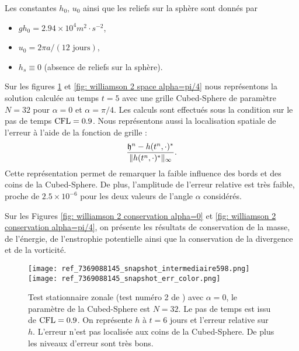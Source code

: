 Les constantes $h_0$, $u_0$ ainsi que les reliefs sur la sphère sont donnés par 
\begin{itemize}
\item $g h_0= 2.94 \times 10^4 m^2 \cdot \si{s^{-2}}$,
\item $u_0= 2 \pi a / (12 \text{ jours})$,
\item $h_s \equiv 0$ (absence de reliefs sur la sphère).
\end{itemize}

Sur les figures \ref{fig: williamson 2 space alpha=0} et \ref{fig: williamson 2 space alpha=pi/4} nous représentons la solution calculée au temps $t=5$ avec une grille Cubed-Sphere de paramètre $N=32$ pour $\alpha= 0$ et $\alpha= \pi/4$. Les calculs sont effectués sous la condition sur le pas de temps $\text{CFL}=0.9$. Nous représentons aussi la localisation spatiale de l'erreur à l'aide de la fonction de grille :
\begin{equation}
\dfrac{\mathfrak{h}^n - h(t^n, \cdot)^*}{\| h(t^n, \cdot)^* \|_{\infty}}.
\end{equation}
Cette représentation permet de remarquer la faible influence des bords et des coins de la Cubed-Sphere. De plus, l'amplitude de l'erreur relative est très faible, proche de $2.5 \times 10^{-6}$ pour les deux valeurs de l'angle $\alpha$ considérés.
 
Sur les Figures \ref{fig: williamson 2 conservation alpha=0} et \ref{fig: williamson 2 conservation alpha=pi/4}, on présente les résultats de conservation de la masse, de l'énergie, de l'enstrophie potentielle ainsi que la conservation de la divergence et de la vorticité.

\begin{figure}[htbp]
\begin{center}
\texttt{[image: ref\_7369088145\_snapshot\_intermediaire598.png]}\\
\texttt{[image: ref\_7369088145\_snapshot\_err\_color.png]}
\end{center}
\caption{Test stationnaire zonale (test numéro 2 de \cite{Williamson1992}) avec $\alpha=0$, le paramètre de la Cubed-Sphere est $N=32$. Le pas de temps est issu de $\text{CFL}=0.9$. On représente $h$ à $t=6$ jours et l'erreur relative sur $h$. L'erreur n'est pas localisée aux coins de la Cubed-Sphere. De plus les niveaux d'erreur sont très bons.}
\label{fig: williamson 2 space alpha=0}
\end{figure}

